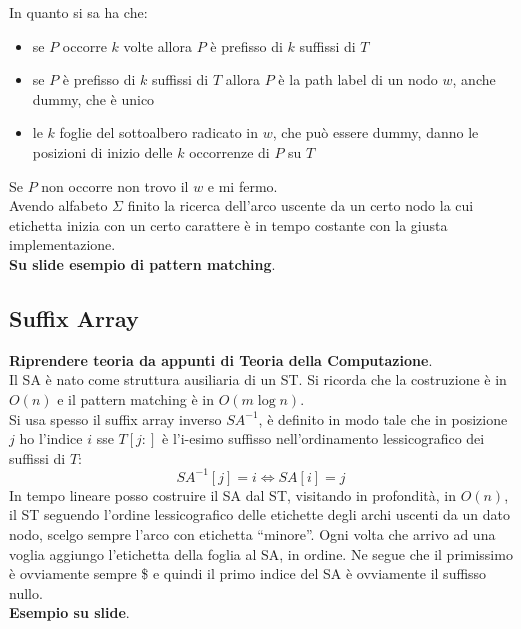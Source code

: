 \documentclass[a4paper,12pt, oneside]{book}
\begin{document}
In quanto si sa ha che:
\begin{itemize}
  \item se $P$ occorre $k$ volte allora $P$ è prefisso di $k$ suffissi di $T$
  \item se $P$ è prefisso di $k$ suffissi di $T$ allora $P$ è la path label di
  un nodo $w$, anche dummy, che è unico
  \item le $k$ foglie del sottoalbero radicato in $w$, che può essere dummy,
  danno le posizioni di 
  inizio delle $k$ occorrenze di $P$ su $T$
\end{itemize}
Se $P$ non occorre non trovo il $w$ e mi fermo.\\
Avendo alfabeto $\Sigma$ finito la ricerca dell'arco uscente da un certo nodo la
cui etichetta inizia con un certo carattere è in tempo costante con la giusta
implementazione.\\
\textbf{Su slide esempio di pattern matching}.
\subsection{Suffix Array}
\textbf{Riprendere teoria da appunti di Teoria della Computazione}.\\
Il SA è nato come struttura ausiliaria di un ST. Si ricorda che la costruzione è
in $O(n)$ e il pattern matching è in $O(m\log n)$.\\
Si usa spesso il suffix array inverso $SA^{-1}$, è definito in modo tale che in
posizione $j$ ho l'indice $i$ sse $T[j:]$ è l'i-esimo suffisso nell'ordinamento
lessicografico dei suffissi di $T$:
\[SA^{-1}[j]=i \iff SA[i]=j\]
In tempo lineare posso costruire il SA dal ST, visitando in profondità, in
$O(n)$, il ST seguendo l'ordine lessicografico delle etichette degli archi
uscenti da un dato nodo, scelgo sempre l'arco con etichetta ``minore''. Ogni
volta che arrivo ad una voglia aggiungo l'etichetta della foglia al SA, in
ordine. Ne segue che il primissimo è ovviamente sempre \$ e quindi il primo
indice del SA è ovviamente il suffisso nullo.\\
\textbf{Esempio su slide}.\\
\end{document}
